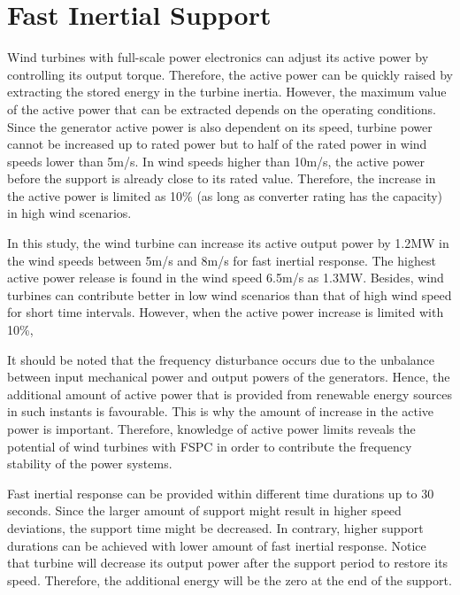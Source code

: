 \section{Fast Inertial Support}
Wind turbines with full-scale power electronics can adjust its active power by controlling its output torque. Therefore, the active power can be quickly raised by extracting the stored energy in the turbine inertia. However, the maximum value of the active power that can be extracted depends on the operating conditions. Since the generator active power is also dependent on its speed, turbine power cannot be increased up to rated power but to half of the rated power in wind speeds lower than 5m/s. In wind speeds higher than 10m/s, the active power before the support is already close to its rated value. Therefore, the increase in the active power is limited as 10\% (as long as converter rating has the capacity) in high wind scenarios. \par
In this study, the wind turbine can increase its active output power by 1.2MW in the wind speeds between 5m/s and 8m/s for fast inertial response. The highest active power release is found in the wind speed 6.5m/s as 1.3MW. Besides, wind turbines can contribute better in low wind scenarios than that of high wind speed for short time intervals. However, when the active power increase is limited with 10\%, \par
It should be noted that the frequency disturbance occurs due to the unbalance between input mechanical power and output powers of the generators. Hence, the additional amount of active power that is provided from renewable energy sources in such instants is favourable. This is why the amount of increase in the active power is important. Therefore, knowledge of active power limits reveals the potential of wind turbines with FSPC in order to contribute the frequency stability of the power systems.\par
Fast inertial response can be provided within different time durations up to 30 seconds. Since the larger amount of support might result in higher speed deviations, the support time might be decreased. In contrary, higher support durations can be achieved with lower amount of fast inertial response. Notice that turbine will decrease its output power after the support period to restore its speed. Therefore, the additional energy will be the zero at the end of the support. \par
